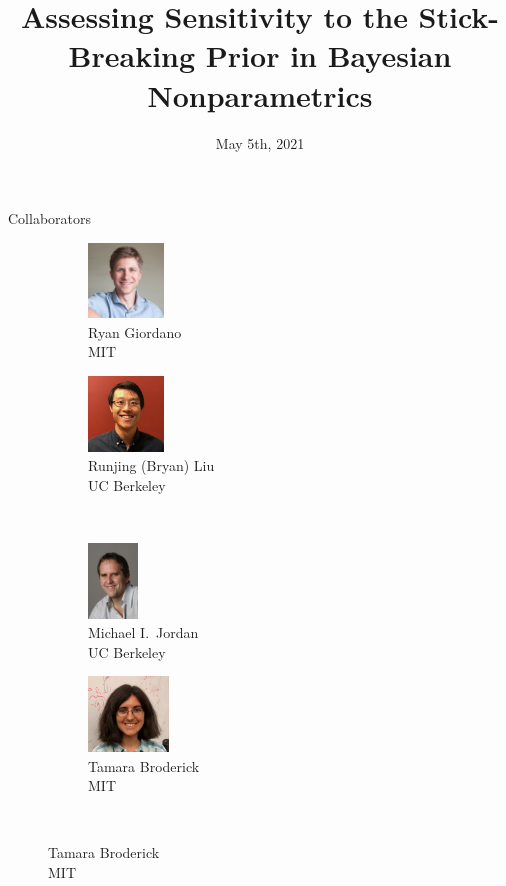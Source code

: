 \documentclass[10pt]{beamer}\usepackage[]{graphicx}\usepackage[]{color}
\title{Assessing Sensitivity to the Stick-Breaking Prior in
Bayesian Nonparametrics}
\author{}
\date{May 5th, 2021}
\institute{University of California, Berkeley}
\begin{document}
\maketitle

\begin{frame}{Collaborators}
  	\vspace{1em}
  	\begin{figure}
  	  	\begin{subfigure}{.4\textwidth}
  			\centering
  			\includegraphics[height=2cm]{collaborators/ryan}
  			\caption*{Ryan Giordano \\ MIT}
  		\end{subfigure}
  		\begin{subfigure}{.4\textwidth}
  			\centering
  			\includegraphics[height=2cm]{collaborators/bryan}
        \captionsetup{justification=centering}
  			\caption*{Runjing (Bryan) Liu \\ UC Berkeley}
  		\end{subfigure}\\%
  		\vspace{0.11in}
      \begin{subfigure}{.4\textwidth}
  			\centering
  			\includegraphics[height=2cm]{collaborators/mike}
  			\caption*{Michael I.\ Jordan \\ UC Berkeley}
  		\end{subfigure}%
  		\begin{subfigure}{.4\textwidth}
  			\centering
  			\includegraphics[height=2cm]{collaborators/tamara}
  			\caption*{Tamara Broderick \\ MIT}
  		\end{subfigure}\\
  	\end{figure}


\end{frame}
















\end{document}
